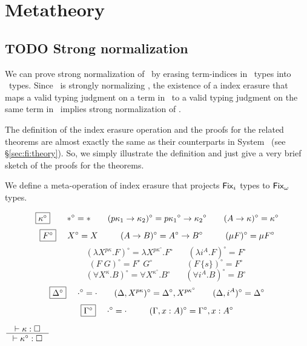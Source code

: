 \section{Metatheory} \label{sec:fixi:theory}

\subsection{TODO Strong normalization} \label{ssec:fixi:theory:sn}
We can prove strong normalization of \Fixi\ by erasing term-indices in \Fixi\ 
types into \Fixw\ types. Since \Fixw\ is strongly normalizing \cite{AbeMat04},
the existence of a index erasure that maps a valid typing judgment on a term
in \Fixi\ to a valid typing judgment on the same term in \Fixw\ implies
strong normalization of \Fixi.

The definition of the index erasure operation and the proofs for
the related theorems are almost exactly the same as their counterparts
in System \Fi\ (see \S\ref{sec:fi:theory}). So, we simply illustrate
the definition and just give a very brief sketch of the proofs for the
theorems.

We define a meta-operation of index erasure that projects $\Fixi$ types
to $\Fixw$ types.
\begin{definition}\label{def:Fixierase}
\[ \fbox{$\kappa^\circ$}
 ~~~~ ~~
 *^\circ =
 *
 ~~~~ ~~
 (p\kappa_1 -> \kappa_2)^\circ =
 p{\kappa_1}^\circ -> {\kappa_2}^\circ
 ~~~~ ~~
 (A -> \kappa)^\circ =
 \kappa^\circ
\]
\[ \fbox{$F^\circ$}
 ~~~~
 X^\circ =
 X
 ~~~~ ~~~~
 (A -> B)^\circ =
 A^\circ -> B^\circ
 ~~~~ ~~~~
 (\mu F)^\circ =
 \mu F^\circ
\]
\[ \qquad
 (\lambda X^{p\kappa}.F)^\circ =
 \lambda X^{p\kappa^\circ}.F^\circ
 ~~~~ ~~~~
 (\lambda i^A.F)^\circ =
 F^\circ
\]
\[ \qquad
 (F\;G)^\circ =
 F^\circ\;G^\circ
 ~~~~ ~~~~ ~~~~ ~~~~ ~~
 (F\,\{s\})^\circ =
 F^\circ
\]
\[ \qquad
 (\forall X^\kappa . B)^\circ =
 \forall X^{\kappa^\circ} . B^\circ
 ~~~~ ~~~~
 (\forall i^A . B)^\circ =
 B^\circ
\]
\[ \fbox{$\Delta^\circ$}
 ~~~~
 \cdot^\circ = \cdot
 ~~~~ ~~
 (\Delta,X^{p\kappa})^\circ = \Delta^\circ,X^{p\kappa^\circ}
 ~~~~ ~~
 (\Delta,i^A)^\circ = \Delta^\circ
\]
\[ \fbox{$\Gamma^\circ$}
 ~~~~
 \cdot^\circ = \cdot
 ~~~~ ~~~~
 (\Gamma,x:A)^\circ = \Gamma^\circ,x:A^\circ
\]
\end{definition}

\begin{theorem}
\label{thm:Fixierasesorting}
	$\inference{|- \kappa : \square}{|- \kappa^\circ : \square}$
\end{theorem}

